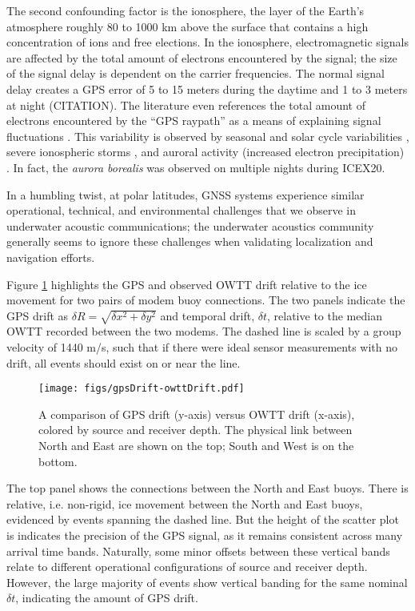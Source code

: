 The second confounding factor is the ionosphere, the layer of the Earth's atmosphere roughly 80 to 1000 km above the surface that contains a high concentration of ions and free elections. 
In the ionosphere, electromagnetic signals are affected by the total amount of electrons encountered by the signal; the size of the signal delay is dependent on the carrier frequencies.
The normal signal delay creates a GPS error of 5 to 15 meters during the daytime and 1 to 3 meters at night (CITATION).
The literature even references the total amount of electrons encountered by the ``GPS raypath'' as a means of explaining signal fluctuations \citep{themens_nature_2015}.
This variability is observed by seasonal and solar cycle variabilities \citep{themens_nature_2015}, severe ionospheric storms \citep{mitchell_gps_2005}, and auroral activity (increased electron precipitation) \citep{jin_gps_2014,gwal_gps_2011}.
In fact, the \textit{aurora borealis} was observed on multiple nights during ICEX20.

In a humbling twist, at polar latitudes, GNSS systems experience similar operational, technical, and environmental challenges that we observe in underwater acoustic communications; the underwater acoustics community generally seems to ignore these challenges when validating localization and navigation efforts.

Figure \ref{fig:gps-drift-example} highlights the GPS and observed OWTT drift relative to the ice movement for two pairs of modem buoy connections.
The two panels indicate the GPS drift as $\delta R = \sqrt{\delta x^2 + \delta y^2}$ and temporal drift, $\delta t$, relative to the median OWTT recorded between the two modems.
The dashed line is scaled by a group velocity of 1440 m/s, such that if there were ideal sensor measurements with no drift, all events should exist on or near the line.

\begin{figure}[h!]
	\centering
	\texttt{[image: figs/gpsDrift-owttDrift.pdf]} 
	\caption{A comparison of GPS drift (y-axis) versus OWTT drift (x-axis), colored by source and receiver depth. The physical link between North and East are shown on the top; South and West is on the bottom.}
	\label{fig:gps-drift-example}
\end{figure}

The top panel shows the connections between the North and East buoys.
There is relative, i.e. non-rigid, ice movement between the North and East buoys, evidenced by events spanning the dashed line.
But the height of the scatter plot is indicates the precision of the GPS signal, as it remains consistent across many arrival time bands.
Naturally, some minor offsets between these vertical bands relate to different operational configurations of source and receiver depth.
However, the large majority of events show vertical banding for the same nominal $\delta t$, indicating the amount of GPS drift.

